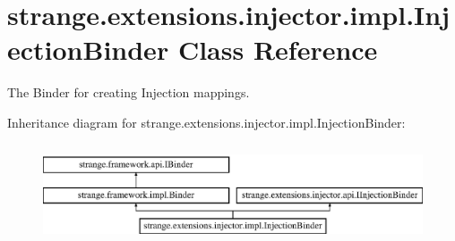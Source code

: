\hypertarget{classstrange_1_1extensions_1_1injector_1_1impl_1_1_injection_binder}{\section{strange.\-extensions.\-injector.\-impl.\-Injection\-Binder Class Reference}
\label{classstrange_1_1extensions_1_1injector_1_1impl_1_1_injection_binder}
}


The Binder for creating Injection mappings.  


Inheritance diagram for strange.\-extensions.\-injector.\-impl.\-Injection\-Binder\-:\begin{figure}[H]
\begin{center}
\leavevmode
\includegraphics[height=2.947368cm]{classstrange_1_1extensions_1_1injector_1_1impl_1_1_injection_binder}
\end{center}
\end{figure}
